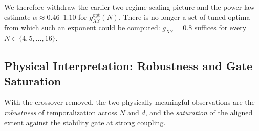 \documentclass[12pt,a4paper]{article}
\begin{document}
We therefore withdraw the earlier two-regime scaling picture and the
power-law estimate $\alpha \approx 0.46$--$1.10$ for
$g_{XY}^{\mathrm{opt}}(N)$. There is no longer a set of tuned optima from
which such an exponent could be computed: $g_{XY}=0.8$ suffices for every
$N \in \{4,5,\ldots,16\}$.

\subsection{Physical Interpretation: Robustness and Gate Saturation}\label{sec:crossover_interpretation}

With the crossover removed, the two physically meaningful observations are
the \emph{robustness} of temporalization across $N$ and $d$, and the
\emph{saturation} of the aligned extent against the stability gate at strong
coupling.
\end{document}
